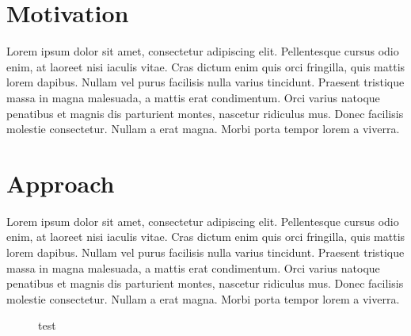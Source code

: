 \newcommand{\feat}{\texttt}







\section{Motivation}
Lorem ipsum dolor sit amet, consectetur adipiscing elit. Pellentesque cursus odio enim, at laoreet nisi iaculis vitae. Cras dictum enim quis orci fringilla, quis mattis lorem dapibus. Nullam vel purus facilisis nulla varius tincidunt. Praesent tristique massa in magna malesuada, a mattis erat condimentum. Orci varius natoque penatibus et magnis dis parturient montes, nascetur ridiculus mus. Donec facilisis molestie consectetur. Nullam a erat magna. Morbi porta tempor lorem a viverra.



\section{Approach}
Lorem ipsum dolor sit amet, consectetur adipiscing elit. Pellentesque cursus odio enim, at laoreet nisi iaculis vitae. Cras dictum enim quis orci fringilla, quis mattis lorem dapibus. Nullam vel purus facilisis nulla varius tincidunt. Praesent tristique massa in magna malesuada, a mattis erat condimentum. Orci varius natoque penatibus et magnis dis parturient montes, nascetur ridiculus mus. Donec facilisis molestie consectetur. Nullam a erat magna. Morbi porta tempor lorem a viverra.


      \begin{figure}[!htb]
        \caption{\label{fig1} test \cite{whit}}
      \end{figure}